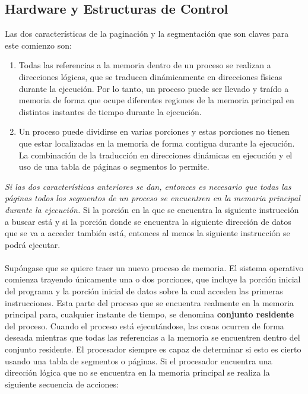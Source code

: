 \documentclass[12pt,a4paper]{article}
\begin{document}
\subsection{Hardware y Estructuras de Control}
Las dos características de la paginación y la segmentación que son claves para este comienzo son:
\begin{enumerate}
    \item Todas las referencias a la memoria dentro de un proceso se realizan a direcciones lógicas, que se traducen dinámicamente en direcciones físicas durante la ejecución. Por lo tanto, un proceso puede ser llevado y traído a memoria de forma que ocupe diferentes regiones de la memoria principal en distintos instantes de tiempo durante la ejecución.
    \item Un proceso puede dividirse en varias porciones y estas porciones no tienen que estar localizadas en la memoria de forma contigua durante la ejecución. La combinación de la traducción en direcciones dinámicas en ejecución y el uso de una tabla de páginas o segmentos lo permite.
\end{enumerate}
\textit{Si las dos características anteriores se dan, entonces es necesario que todas las páginas todos los segmentos  de un proceso se encuentren en la memoria principal durante la ejecución.} Si la porción en la que se encuentra la siguiente instrucción a buscar está y si la porción donde se encuentra la siguiente dirección de datos que se va a acceder también está, entonces al menos la siguiente instrucción se podrá ejecutar.\\\\ 
Supóngase que se quiere traer un nuevo proceso de memoria. El sistema operativo comienza trayendo únicamente una o dos porciones, que incluye la porción inicial del programa y la porción inicial de datos sobre la cual acceden las primeras instrucciones. Esta parte del  proceso que se encuentra realmente en la memoria principal para, cualquier instante de tiempo, se denomina \textbf{conjunto residente} del proceso. Cuando el proceso está ejecutándose, las cosas ocurren de forma deseada mientras que todas las referencias a la memoria se encuentren dentro del conjunto residente. El procesador siempre es capaz de determinar si esto es cierto usando una tabla de segmentos o páginas. Si el procesador encuentra una dirección lógica que no se encuentra en la memoria principal se realiza la siguiente secuencia de acciones:
\end{document}
